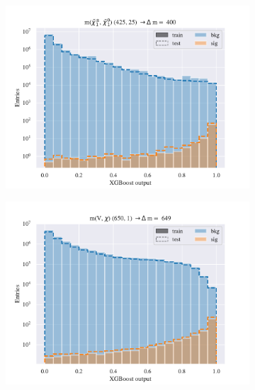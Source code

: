 \begin{figure}[H]
\begin{subfigure}[t!]{0.49\textwidth}
        \includegraphics[width = \textwidth]{Figures/WW/BDT/Low_level/High/scaled_train_test_395330.pdf}
        \caption{}
        \label{fig:traintestscaled}
    \end{subfigure}
    \begin{subfigure}[t!]{0.49\textwidth}
        \includegraphics[width = \textwidth]{Figures/Mono_Z/ML/BDT/Low_level/High/scaled_train_test_310617.pdf}
        \caption{}
        \label{fig:ROCBDTLow_low_level}
    \end{subfigure}
    \caption{}
    \label{fig:resExample}
\end{figure}

